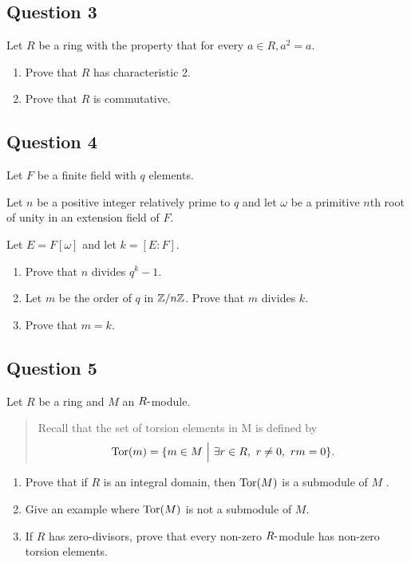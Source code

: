 \documentclass[12pt]{article}
\begin{document}
\hypertarget{question-3}{%
\subsection{Question 3}\label{question-3}}

Let \(R\) be a ring with the property that for every
\(a \in R, a^2 = a\).

\begin{enumerate}
\def\labelenumi{(\alph{enumi})}
\item
  Prove that \(R\) has characteristic 2.
\item
  Prove that \(R\) is commutative.
\end{enumerate}

\hypertarget{question-4}{%
\subsection{Question 4}\label{question-4}}

Let \(F\) be a finite field with \(q\) elements.

Let \(n\) be a positive integer relatively prime to \(q\) and let
\(\omega\) be a primitive \(n\)th root of unity in an extension field of
\(F\).

Let \(E = F [\omega]\) and let \(k = [E : F]\).

\begin{enumerate}
\def\labelenumi{(\alph{enumi})}
\item
  Prove that \(n\) divides \(q^{k}-1\).
\item
  Let \(m\) be the order of \(q\) in \({\mathbb{Z}}/n{\mathbb{Z}}\). Prove that \(m\)
  divides \(k\).
\item
  Prove that \(m = k\).
\end{enumerate}

\hypertarget{question-5}{%
\subsection{Question 5}\label{question-5}}

Let \(R\) be a ring and \(M\) an \(R{\hbox{-}}\)module.

\begin{quote}
Recall that the set of torsion elements in M is defined by \[
\text{Tor}(m) = \{m \in M {~\mathrel{\Big|}~} \exists r \in R, ~r \neq 0, ~rm = 0\}
.\]
\end{quote}

\begin{enumerate}
\def\labelenumi{(\alph{enumi})}
\item
  Prove that if \(R\) is an integral domain, then \(\text{Tor}(M )\) is a
  submodule of \(M\) .
\item
  Give an example where \(\text{Tor}(M )\) is not a submodule of \(M\).
\item
  If \(R\) has zero-divisors, prove that every non-zero \(R{\hbox{-}}\)module
  has non-zero torsion elements.
\end{enumerate}
\end{document}
